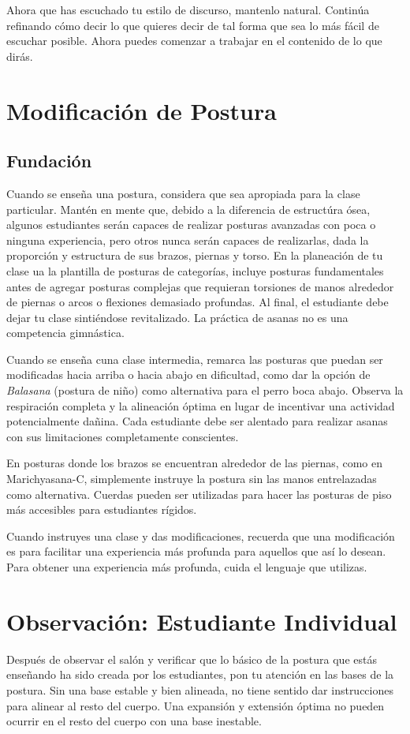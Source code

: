 Ahora que has escuchado tu estilo de discurso, mantenlo natural. Continúa refinando cómo decir lo que quieres decir de tal forma que sea lo más fácil de escuchar posible. Ahora puedes comenzar a trabajar en el contenido de lo que dirás.

\section{Modificación de Postura}
\subsection{Fundación}
Cuando se enseña una postura, considera que sea apropiada para la clase particular. Mant\'en en mente que, debido a la diferencia de estructúra ósea, algunos estudiantes serán capaces de realizar posturas avanzadas con poca o ninguna experiencia, pero otros nunca serán capaces de realizarlas, dada la proporción y estructura de sus brazos, piernas y torso. En la planeación de tu clase ua la plantilla de posturas de categorías, incluye posturas fundamentales antes de agregar posturas complejas que requieran torsiones de manos alrededor de piernas o arcos o flexiones demasiado profundas. Al final, el estudiante debe dejar tu clase sinti\'endose revitalizado. La práctica de asanas no es una competencia gimnástica.

Cuando se enseña cuna clase intermedia, remarca las posturas que puedan ser modificadas hacia arriba o hacia abajo en dificultad, como dar la opción de \textit{Balasana} (postura de niño) como alternativa para el perro boca abajo. Observa la respiración completa y la alineación óptima en lugar de incentivar una actividad potencialmente dañina. Cada estudiante debe ser alentado para realizar asanas con sus limitaciones completamente conscientes.

En posturas donde los brazos se encuentran alrededor de las piernas, como en Marichyasana-C, simplemente instruye la postura sin las manos entrelazadas como alternativa. Cuerdas pueden ser utilizadas para hacer las posturas de piso más accesibles para estudiantes rígidos.

Cuando instruyes una clase y das modificaciones, recuerda que una modificación es para facilitar una experiencia más profunda para aquellos que así lo desean. Para obtener una experiencia más profunda, cuida el lenguaje que utilizas.

\section{Observación: Estudiante Individual}
Despu\'es de observar el salón y verificar que lo básico de la postura que estás enseñando ha sido creada por los estudiantes, pon tu atención en las bases de la postura. Sin una base estable y bien alineada, no tiene sentido dar instrucciones para alinear al resto del cuerpo. Una expansión y extensión óptima no pueden ocurrir en el resto del cuerpo con una base inestable.

